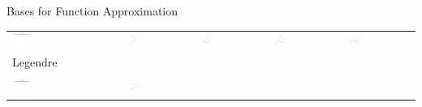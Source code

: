 \documentclass[10pt,compress,xcolor={usenames,dvipsnames},aspectratio=169]{beamer}
\begin{document}
\begin{frame}{Bases for Function Approximation}
\vspace{-3ex}
	\begin{tabular}{>{\centering}m{}>{\centering}m{}>{\centering}m{}>{\centering}m{}>{\centering}m{}}
		\includegraphics[width =0.18\textwidth]{ProgramsImages/Legendre_Degree_0_1D_k.png}  &
		\includegraphics[width =0.18\textwidth]{ProgramsImages/Legendre_Degree_1_1D_k.png}  &
		\includegraphics[width =0.18\textwidth]{ProgramsImages/Legendre_Degree_2_1D_k.png}  &
		\includegraphics[width =0.18\textwidth]{ProgramsImages/Legendre_Degree_3_1D_k.png}  &
		\includegraphics[width =0.18\textwidth]{ProgramsImages/Legendre_Degree_4_1D_k.png} 
	\tabularnewline[-7ex]
	Legendre
	\tabularnewline
\tabularnewline[3ex]
		\includegraphics[width =0.18\textwidth]{ProgramsImages/Chebyshev_Degree_0_1D_k.png}  &
\includegraphics[width =0.18\textwidth]{ProgramsImages/Chebyshev_Degree_1_1D_k.png}  &

\end{tabular}
\end{frame}
\end{document}
